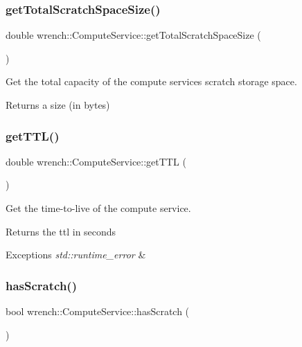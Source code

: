 \subsubsection{\texorpdfstring{get\+Total\+Scratch\+Space\+Size()}{getTotalScratchSpaceSize()}}
{\footnotesize\ttfamily double wrench\+::\+Compute\+Service\+::get\+Total\+Scratch\+Space\+Size (\begin{DoxyParamCaption}{ }\end{DoxyParamCaption})}



Get the total capacity of the compute service\textquotesingle{}s scratch storage space. 

\begin{DoxyReturn}{Returns}
a size (in bytes) 
\end{DoxyReturn}
\mbox{\label{classwrench_1_1_compute_service_a244e08a35ea94061acc1396f9447bb0c}} 
\subsubsection{\texorpdfstring{get\+T\+T\+L()}{getTTL()}}
{\footnotesize\ttfamily double wrench\+::\+Compute\+Service\+::get\+T\+TL (\begin{DoxyParamCaption}{ }\end{DoxyParamCaption})}



Get the time-\/to-\/live of the compute service. 

\begin{DoxyReturn}{Returns}
the ttl in seconds
\end{DoxyReturn}

\begin{DoxyExceptions}{Exceptions}
{\em std\+::runtime\+\_\+error} & \\
\hline
\end{DoxyExceptions}
\mbox{\label{classwrench_1_1_compute_service_a07b64249656b26fef280c1f9db823acf}} 
\subsubsection{\texorpdfstring{has\+Scratch()}{hasScratch()}}
{\footnotesize\ttfamily bool wrench\+::\+Compute\+Service\+::has\+Scratch (\begin{DoxyParamCaption}{ }\end{DoxyParamCaption})}




